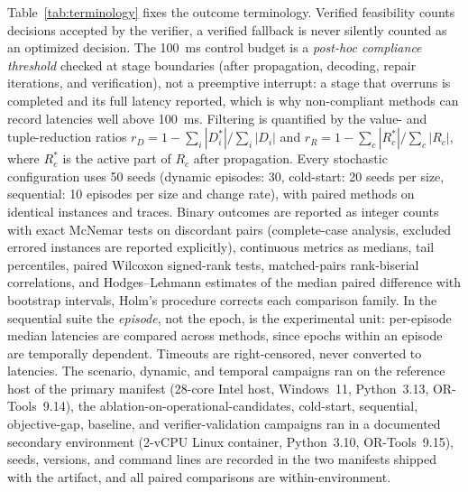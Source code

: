 \documentclass[pdflatex,sn-mathphys-num,iicol,oneside]{sn-jnl}
\begin{document}
Table~\ref{tab:terminology} fixes the outcome terminology. Verified
feasibility counts decisions accepted by the verifier, a verified
fallback is never silently counted as an optimized decision. The
100~ms control budget is a \emph{post-hoc compliance threshold}
checked at stage boundaries (after propagation, decoding, repair
iterations, and verification), not a preemptive interrupt: a stage
that overruns is completed and its full latency reported, which is
why non-compliant methods can record latencies well above 100~ms.
Filtering is quantified by the value- and tuple-reduction ratios
$r_D=1-\sum_i|D_i^{*}|/\sum_i|D_i|$ and
$r_R=1-\sum_c|R_c^{*}|/\sum_c|R_c|$, where $R_c^{*}$ is the active
part of $R_c$ after propagation. Every stochastic configuration uses
50 seeds (dynamic episodes: 30, cold-start: 20 seeds per size,
sequential: 10 episodes per size and change rate), with paired methods
on identical instances and traces. Binary outcomes are reported as
integer counts with exact McNemar tests on discordant pairs
(complete-case analysis, excluded errored instances are reported
explicitly), continuous metrics as medians, tail percentiles, paired
Wilcoxon signed-rank tests, matched-pairs rank-biserial correlations,
and Hodges--Lehmann estimates of the median paired difference with
bootstrap intervals, Holm's procedure corrects each comparison family.
In the sequential suite the \emph{episode}, not the epoch, is the
experimental unit: per-episode median latencies are compared across
methods, since epochs within an episode are temporally dependent.
Timeouts are right-censored, never converted to latencies. The
scenario, dynamic, and temporal campaigns ran on the reference host of
the primary manifest (28-core Intel host, Windows~11, Python~3.13,
OR-Tools~9.14), the ablation-on-operational-candidates, cold-start,
sequential, objective-gap, baseline, and verifier-validation campaigns
ran in a documented secondary environment (2-vCPU Linux container,
Python~3.10, OR-Tools~9.15), seeds, versions, and command lines are
recorded in the two manifests shipped with the artifact, and all
paired comparisons are within-environment.
\end{document}
